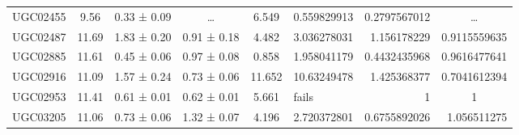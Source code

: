\documentclass[reprint,%
 amsmath,amssymb,
 aps,
]{revtex4-1}
\begin{document}
\begin{table}[]
\begin{tabular}{cccccrrc}
\rowcolor[HTML]{F3F3F3} 
UGC02455             & 9.56                      & 0.33 ± 0.09           & …                      & 6.549                                                        & 0.559829913                                                           & 0.2797567012                                                          & …                                                             \\
\rowcolor[HTML]{F3F3F3} 
UGC02487             & 11.69                     & 1.83 ± 0.20           & 0.91 ± 0.18            & 4.482                                                        & 3.036278031                                                           & 1.156178229                                                           & \multicolumn{1}{r}{\cellcolor[HTML]{F3F3F3}0.9115559635}      \\
\rowcolor[HTML]{F3F3F3} 
UGC02885             & 11.61                     & 0.45 ± 0.06           & 0.97 ± 0.08            & 0.858                                                        & 1.958041179                                                           & 0.4432435968                                                          & \multicolumn{1}{r}{\cellcolor[HTML]{F3F3F3}0.9616477641}      \\
\rowcolor[HTML]{F3F3F3} 
UGC02916             & 11.09                     & 1.57 ± 0.24           & 0.73 ± 0.06            & 11.652                                                       & 10.63249478                                                           & 1.425368377                                                           & \multicolumn{1}{r}{\cellcolor[HTML]{F3F3F3}0.7041612394}      \\
\rowcolor[HTML]{F3F3F3} 
UGC02953             & 11.41                     & 0.61 ± 0.01           & 0.62 ± 0.01            & 5.661                                                        & \multicolumn{1}{l}{\cellcolor[HTML]{F3F3F3}fails}                     & 1                                                                     & 1                                                             \\
\rowcolor[HTML]{F3F3F3} 
UGC03205             & 11.06                     & 0.73 ± 0.06           & 1.32 ± 0.07            & 4.196                                                        & 2.720372801                                                           & 0.6755892026                                                          & \multicolumn{1}{r}{\cellcolor[HTML]{F3F3F3}1.056511275}       \\

\end{tabular}
\end{table}
\end{document}
